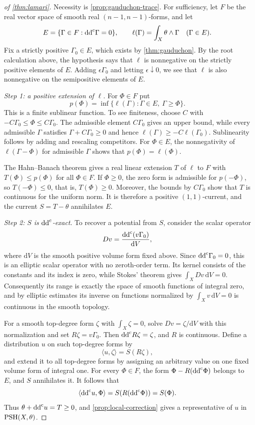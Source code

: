 \begin{proof}[of \cref{thm:lamari}]
Necessity is \cref{prop:gauduchon-trace}. For sufficiency, let $F$ be the real vector space of smooth real $(n-1,n-1)$-forms, and let
\[
 E=\{\Gamma\in F:\mathrm{dd}^{\mathrm{c}}\Gamma=0\},\qquad
 \ell(\Gamma)=\int_X\theta\wedge\Gamma\quad(\Gamma\in E).
\]
Fix a strictly positive $\Gamma_0\in E$, which exists by \cref{thm:gauduchon}. By the root calculation above, the hypothesis says that $\ell$ is nonnegative on the strictly positive elements of $E$. Adding $\epsilon\Gamma_0$ and letting $\epsilon\downarrow0$, we see that $\ell$ is also nonnegative on the semipositive elements of $E$.

\emph{Step 1: a positive extension of $\ell$.} For $\Phi\in F$ put
\[
 p(\Phi)=\inf\{\ell(\Gamma):\Gamma\in E,\ \Gamma\geq\Phi\}.
\]
This is a finite sublinear function. To see finiteness, choose $C$ with $-C\Gamma_0\leq\Phi\leq C\Gamma_0$. The admissible element $C\Gamma_0$ gives an upper bound, while every admissible $\Gamma$ satisfies $\Gamma+C\Gamma_0\geq0$ and hence $\ell(\Gamma)\geq-C\ell(\Gamma_0)$. Sublinearity follows by adding and rescaling competitors. For $\Phi\in E$, the nonnegativity of $\ell(\Gamma-\Phi)$ for admissible $\Gamma$ shows that $p(\Phi)=\ell(\Phi)$.

The Hahn--Banach theorem gives a real linear extension $T$ of $\ell$ to $F$ with $T(\Phi)\leq p(\Phi)$ for all $\Phi\in F$. If $\Phi\geq0$, the zero form is admissible for $p(-\Phi)$, so $T(-\Phi)\leq0$, that is, $T(\Phi)\geq0$. Moreover, the bounds by $C\Gamma_0$ show that $T$ is continuous for the uniform norm. It is therefore a positive $(1,1)$-current, and the current $S=T-\theta$ annihilates $E$.

\emph{Step 2: $S$ is $\mathrm{dd}^{\mathrm{c}}$-exact.} To recover a potential from $S$, consider the scalar operator
\[
 Dv=\frac{\mathrm{dd}^{\mathrm{c}}(v\Gamma_0)}{\mathrm{d}V},
\]
where $\mathrm dV$ is the smooth positive volume form fixed above. Since $\mathrm{dd}^{\mathrm{c}}\Gamma_0=0$, this is an elliptic scalar operator with no zeroth-order term. Its kernel consists of the constants and its index is zero, while Stokes' theorem gives $\int_XDv\,\mathrm{d}V=0$. Consequently its range is exactly the space of smooth functions of integral zero, and by elliptic estimates its inverse on functions normalized by $\int_Xv\,\mathrm{d}V=0$ is continuous in the smooth topology.

For a smooth top-degree form $\zeta$ with $\int_X\zeta=0$, solve $Dv=\zeta/\mathrm{d}V$ with this normalization and set $R\zeta=v\Gamma_0$. Then $\mathrm{dd}^{\mathrm{c}} R\zeta=\zeta$, and $R$ is continuous. Define a distribution $u$ on such top-degree forms by
\[
 \langle u,\zeta\rangle=S(R\zeta),
\]
and extend it to all top-degree forms by assigning an arbitrary value on one fixed volume form of integral one. For every $\Phi\in F$, the form $\Phi-R(\mathrm{dd}^{\mathrm{c}}\Phi)$ belongs to $E$, and $S$ annihilates it. It follows that
\[
 \langle\mathrm{dd}^{\mathrm{c}} u,\Phi\rangle
 =S(R(\mathrm{dd}^{\mathrm{c}}\Phi))=S(\Phi).
\]
Thus $\theta+\mathrm{dd}^{\mathrm{c}} u=T\geq0$, and \cref{prop:local-correction} gives a representative of $u$ in $\mathrm{PSH}(X,\theta)$.
\end{proof}

